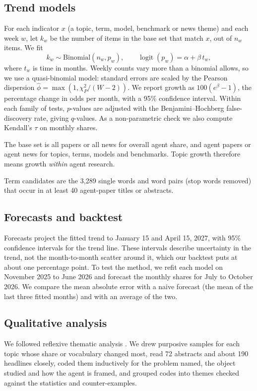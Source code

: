\documentclass[10.5pt]{article}
\begin{document}
\subsection{Trend models}

For each indicator $x$ (a topic, term, model, benchmark or news theme) and each week $w$, let $k_w$ be the number of items in the base set that match $x$, out of $n_w$ items. We fit
\[
k_w \sim \text{Binomial}(n_w, p_w), \qquad \operatorname{logit}(p_w) = \alpha + \beta\, t_w,
\]
where $t_w$ is time in months. Weekly counts vary more than a binomial allows, so we use a quasi-binomial model: standard errors are scaled by the Pearson dispersion $\hat\phi = \max(1, \chi^2_P/(W-2))$. We report growth as $100(e^{\beta}-1)$, the percentage change in odds per month, with a 95\% confidence interval. Within each family of tests, $p$-values are adjusted with the Benjamini--Hochberg false-discovery rate, giving $q$-values. As a non-parametric check we also compute Kendall's $\tau$ on monthly shares.

The base set is all papers or all news for overall agent share, and agent papers or agent news for topics, terms, models and benchmarks. Topic growth therefore means growth \emph{within} agent research.

Term candidates are the 3,289 single words and word pairs (stop words removed) that occur in at least 40 agent-paper titles or abstracts.

\subsection{Forecasts and backtest}

Forecasts project the fitted trend to January 15 and April 15, 2027, with 95\% confidence intervals for the trend line. These intervals describe uncertainty in the trend, not the month-to-month scatter around it, which our backtest puts at about one percentage point. To test the method, we refit each model on November 2025 to June 2026 and forecast the monthly shares for July to October 2026. We compare the mean absolute error with a naive forecast (the mean of the last three fitted months) and with an average of the two.

\subsection{Qualitative analysis}\label{sec:qual}

We followed reflexive thematic analysis \cite{braun2006,braun2019}. We drew purposive samples for each topic whose share or vocabulary changed most, read 72 abstracts and about 190 headlines closely, coded them inductively for the problem named, the object studied and how the agent is framed, and grouped codes into themes checked against the statistics and counter-examples.
\end{document}

